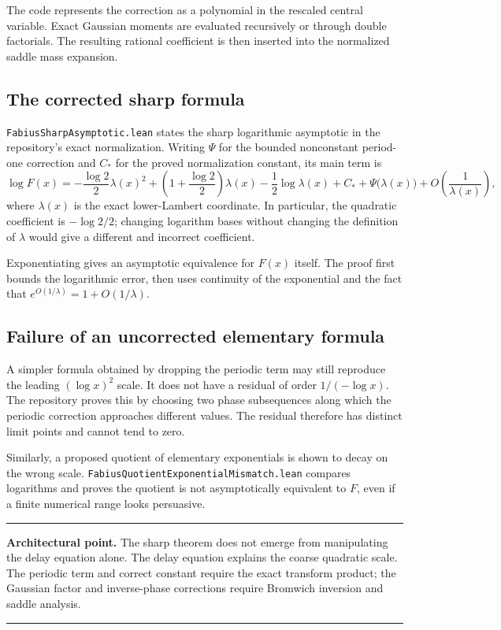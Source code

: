\documentclass[11pt,oneside]{article}
\theoremstyle{definition}
\theoremstyle{remark}
\newenvironment{boxedremark}{%
  \par\smallskip\noindent\begin{center}\begin{minipage}{0.94\textwidth}%
  \color{black}\hrule\vspace{0.6em}\small
}{%
  \vspace{0.6em}\hrule\end{minipage}\end{center}\smallskip
}
\begin{document}
The code represents the correction as a polynomial in the rescaled central variable.  Exact Gaussian moments are evaluated recursively or through double factorials.  The resulting rational coefficient is then inserted into the normalized saddle mass expansion.

\subsection{The corrected sharp formula}
\nolinkurl{FabiusSharpAsymptotic.lean} states the sharp logarithmic asymptotic in the repository's exact normalization.  Writing \(\Psi\) for the bounded nonconstant period-one correction and \(C_*\) for the proved normalization constant, its main term is
\[
  \log F(x)=
  -\frac{\log2}{2}\lambda(x)^2
  +\left(1+\frac{\log2}{2}\right)\lambda(x)
  -\frac12\log\lambda(x)
  +C_*+\Psi\bigl(\lambda(x)\bigr)
  +O\!\left(\frac1{\lambda(x)}\right),
\]
where \(\lambda(x)\) is the exact lower-Lambert coordinate.  In particular, the quadratic coefficient is \(-\log2/2\); changing logarithm bases without changing the definition of \(\lambda\) would give a different and incorrect coefficient.

Exponentiating gives an asymptotic equivalence for \(F(x)\) itself.  The proof first bounds the logarithmic error, then uses continuity of the exponential and the fact that \(e^{O(1/\lambda)}=1+O(1/\lambda)\).

\subsection{Failure of an uncorrected elementary formula}
A simpler formula obtained by dropping the periodic term may still reproduce the leading \((\log x)^2\) scale.  It does not have a residual of order \(1/(-\log x)\).  The repository proves this by choosing two phase subsequences along which the periodic correction approaches different values.  The residual therefore has distinct limit points and cannot tend to zero.

Similarly, a proposed quotient of elementary exponentials is shown to decay on the wrong scale.  \nolinkurl{FabiusQuotientExponentialMismatch.lean} compares logarithms and proves the quotient is not asymptotically equivalent to \(F\), even if a finite numerical range looks persuasive.

\begin{boxedremark}\textbf{Architectural point.}\space
The sharp theorem does not emerge from manipulating the delay equation alone.  The delay equation explains the coarse quadratic scale.  The periodic term and correct constant require the exact transform product; the Gaussian factor and inverse-phase corrections require Bromwich inversion and saddle analysis.
\end{boxedremark}
\end{document}
